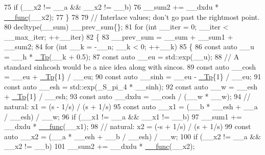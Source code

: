 \begin{DoxyCode}
75           \textcolor{keywordflow}{if} (\_\_x2 != \_\_a && \_\_x2 != \_\_b)
76             \_\_sum2 += \_\_dxdu * \hyperlink{namespace____gnu__cxx_af2b2f0c7a2ae72b922b1afefae5a65b2}{\_\_func}(\_\_x2);
77         \}
78 
79       \textcolor{comment}{// Interlace values; don't go past the rightmost point.}
80       decltype(\_\_sum) \_\_prev\_sum\{\};
81       \textcolor{keywordflow}{for} (\textcolor{keywordtype}{int} \_\_iter = 0; \_\_iter < \_\_max\_iter; ++\_\_iter)
82         \{
83           \_\_prev\_sum = \_\_sum + \_\_sum1 + \_\_sum2;
84           \textcolor{keywordflow}{for} (\textcolor{keywordtype}{int} \_\_k  = -\_\_n; \_\_k < 0; ++\_\_k)
85             \{
86               \textcolor{keyword}{const} \textcolor{keyword}{auto} \_\_u = \_\_h * \hyperlink{namespace____gnu__cxx_a3b19a9c800ca194374ef9172290f7d79}{\_Tp}(\_\_k + 0.5);
87               \textcolor{keyword}{const} \textcolor{keyword}{auto} \_\_eu = std::exp(\_\_u);
88               \textcolor{comment}{// A standard sinhcosh would be a nice idea along with sincos.}
89               \textcolor{keyword}{const} \textcolor{keyword}{auto} \_\_cosh = \_\_eu + \hyperlink{namespace____gnu__cxx_a3b19a9c800ca194374ef9172290f7d79}{\_Tp}\{1\} / \_\_eu;
90               \textcolor{keyword}{const} \textcolor{keyword}{auto} \_\_sinh = \_\_eu - \hyperlink{namespace____gnu__cxx_a3b19a9c800ca194374ef9172290f7d79}{\_Tp}\{1\} / \_\_eu;
91               \textcolor{keyword}{const} \textcolor{keyword}{auto} \_\_esh = std::exp(\_S\_pi\_4 * \_\_sinh);
92               \textcolor{keyword}{const} \textcolor{keyword}{auto} \_\_w = \_\_esh + \hyperlink{namespace____gnu__cxx_a3b19a9c800ca194374ef9172290f7d79}{\_Tp}\{1\} / \_\_esh;
93               \textcolor{keyword}{const} \textcolor{keyword}{auto} \_\_dxdu = \_\_cosh / (\_\_w * \_\_w);
94               \textcolor{comment}{// natural: x1 = (s - 1/s) / (s + 1/s)}
95               \textcolor{keyword}{const} \textcolor{keyword}{auto} \_\_x1 = (\_\_b * \_\_esh + \_\_a / \_\_esh) / \_\_w;
96               \textcolor{keywordflow}{if} (\_\_x1 != \_\_a && \_\_x1 != \_\_b) 
97                 \_\_sum1 += \_\_dxdu * \hyperlink{namespace____gnu__cxx_af2b2f0c7a2ae72b922b1afefae5a65b2}{\_\_func}(\_\_x1);
98               \textcolor{comment}{// natural: x2 = (-s + 1/s) / (s + 1/s)}
99               \textcolor{keyword}{const} \textcolor{keyword}{auto} \_\_x2 = (\_\_a * \_\_esh + \_\_b / \_\_esh) / \_\_w;
100               \textcolor{keywordflow}{if} (\_\_x2 != \_\_a && \_\_x2 != \_\_b)
101                 \_\_sum2 += \_\_dxdu * \hyperlink{namespace____gnu__cxx_af2b2f0c7a2ae72b922b1afefae5a65b2}{\_\_func}(\_\_x2);

\end{DoxyCode}
